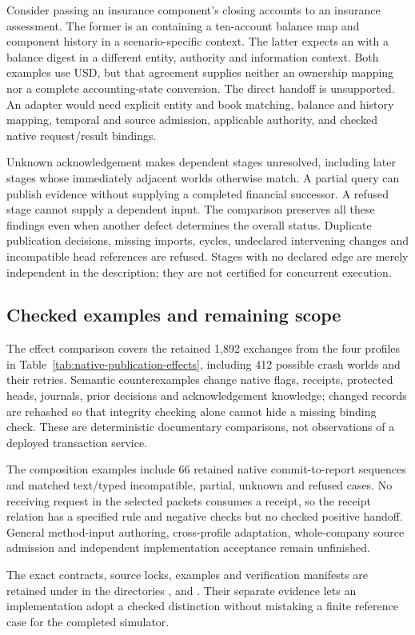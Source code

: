 Consider passing an insurance component's closing accounts to an insurance
assessment. The former is an  containing a ten-account balance
map and component history in a scenario-specific context. The latter expects
an  with a balance digest in a different entity, authority
and information context. Both examples use USD, but that agreement supplies
neither an ownership mapping nor a complete accounting-state conversion. The
direct handoff is unsupported. An adapter would need explicit entity and book
matching, balance and history mapping, temporal and source admission, applicable
authority, and checked native request/result bindings.

Unknown acknowledgement makes dependent stages unresolved, including later
stages whose immediately adjacent worlds otherwise match. A partial query can
publish evidence without supplying a completed financial successor. A refused
stage cannot supply a dependent input. The comparison preserves all these
findings even when another defect determines the overall status. Duplicate
publication decisions, missing imports, cycles, undeclared intervening changes
and incompatible head references are refused. Stages with no declared edge are
merely independent in the description; they are not certified for concurrent
execution.

\subsection{Checked examples and remaining scope}

The effect comparison covers the retained 1,892 exchanges from the four profiles
in Table~\ref{tab:native-publication-effects}, including 412 possible crash worlds
and their retries. Semantic counterexamples change native flags, receipts,
protected heads, journals, prior decisions and acknowledgement knowledge; changed
records are rehashed so that integrity checking alone cannot hide a missing
binding check. These are deterministic documentary comparisons, not observations
of a deployed transaction service.

The composition examples include 66 retained native commit-to-report sequences
and matched text/typed incompatible, partial, unknown and refused cases. No
receiving request in the selected packets consumes a receipt, so the receipt
relation has a specified rule and negative checks but no checked positive
handoff. General method-input authoring, cross-profile adaptation, whole-company
source admission and independent implementation acceptance remain unfinished.

The exact contracts, source locks, examples and verification manifests are
retained under  in the directories
,
 and
.
Their separate evidence lets an implementation adopt a checked distinction
without mistaking a finite reference case for the completed simulator.
